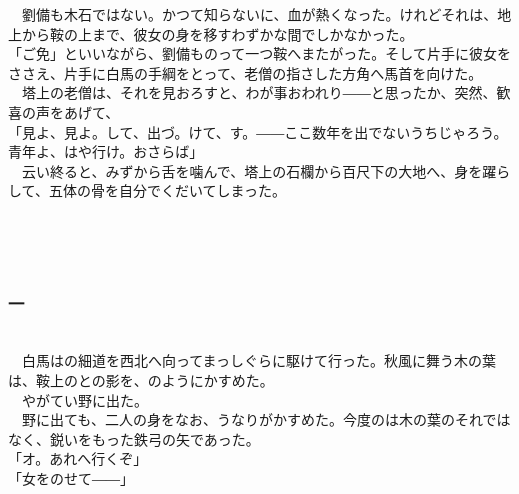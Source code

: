 \documentclass[
  paper=a5,
  fontsize=10pt,
  jafontsize=9.5pt,
  tate,                  %
  open_bracket_pos=nibu, %
]{jlreq}
\begin{document}
　劉備も木石ではない。かつて知らないに、血が熱くなった。けれどそれは、地上から鞍の上まで、彼女の身を移すわずかな間でしかなかった。\\


「ご免」といいながら、劉備ものって一つ鞍へまたがった。そして片手に彼女をささえ、片手に白馬の手綱をとって、老僧の指さした方角へ馬首を向けた。\\


　塔上の老僧は、それを見おろすと、わが事おわれり――と思ったか、突然、歓喜の声をあげて、\\


「見よ、見よ。して、出づ。けて、す。――ここ数年を出でないうちじゃろう。青年よ、はや行け。おさらば」\\


　云い終ると、みずから舌を噛んで、塔上の石欄から百尺下の大地へ、身を躍らして、五体の骨を自分でくだいてしまった。\\

\\

\subsection{}

\\

\subsubsection{一}

\\


　白馬はの細道を西北へ向ってまっしぐらに駆けて行った。秋風に舞う木の葉は、鞍上のとの影を、のようにかすめた。\\


　やがてい野に出た。\\


　野に出ても、二人の身をなお、うなりがかすめた。今度のは木の葉のそれではなく、鋭いをもった鉄弓の矢であった。\\


「オ。あれへ行くぞ」\\


「女をのせて――」\\
\end{document}
